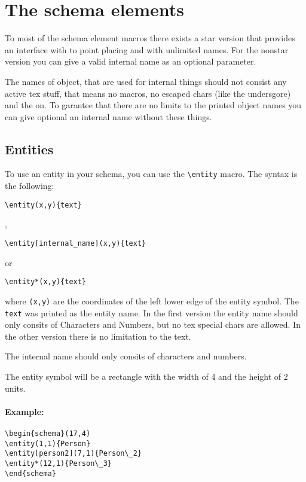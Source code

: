 \documentclass[a4paper,11pt]{article}
\begin{document}
\section{The schema elements}

To most of the schema element macros there exists a star version that
provides an interface with to point placing and with unlimited names.
For the nonstar version you can give a valid internal name as an optional 
parameter.

The names of object, that are used for internal things should not consist any
active tex stuff, that means no macros, no escaped chars (like the undersgore)
and the on. To garantee that there are no limits to the printed object names 
you can give optional an internal name without these things.

\subsection{Entities}

To use an entity in your schema, you can use the \verb|\entity| macro.
The syntax is the following:

\begin{verbatim}
\entity(x,y){text}
\end{verbatim}

,

\begin{verbatim}
\entity[internal_name](x,y){text}
\end{verbatim}

or 

\begin{verbatim}
\entity*(x,y){text}
\end{verbatim}

where {\tt (x,y)} are the coordinates of the left lower edge of the entity
symbol. The {\tt text} was printed as the entity name. In the first version 
the entity name should only consits of Characters and Numbers, 
but no tex special chars are allowed.
In the other version there is no limitation to the text.

The internal name should only consits of characters and numbers.

The entity symbol will be a rectangle with the width of 4 and the height of 2 
units.

\paragraph{Example:}
\begin{verbatim}
\begin{schema}(17,4)
\entity(1,1){Person}
\entity[person2](7,1){Person\_2}
\entity*(12,1){Person\_3}
\end{schema}
\end{verbatim}
\end{document}

